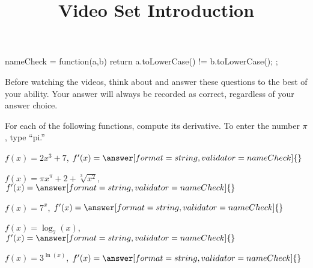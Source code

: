 \documentclass[handout]{ximera}
\title{Video Set Introduction}
\begin{document}
\begin{abstract}
\end{abstract}


\maketitle


\begin{javascript}
  nameCheck = function(a,b) {
    return a.toLowerCase() != b.toLowerCase();
  };
\end{javascript}

Before watching the videos, think about and answer these questions to the best of your ability. Your answer will always be recorded as correct, regardless of your answer choice.


For each of the following functions, compute its derivative. To enter the number $\pi$, type ``pi.''

\begin{problem}
$f(x)=2x^3+7$, $f'(x)=\answer[format=string,validator=nameCheck]{}$
\end{problem}

\begin{problem}
$f(x) = \pi x^{\pi} + 2 + \sqrt[3]{x^2}$, $f'(x)=\answer[format=string,validator=nameCheck]{}$
\end{problem}

\begin{problem}
$f(x)=7^x$, $f'(x)=\answer[format=string,validator=nameCheck]{}$
\end{problem}

\begin{problem}
$f(x)=\log_7(x)$, $f'(x)=\answer[format=string,validator=nameCheck]{}$
\end{problem}

\begin{problem}
$f(x)=3^{\ln(x)}$, $f'(x)=\answer[format=string,validator=nameCheck]{}$
\end{problem}
\end{document}
